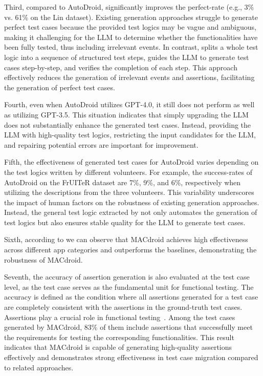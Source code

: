 Third, compared to AutoDroid, \toolNameSmall{} significantly improves the perfect-rate (e.g., 3\% vs. 61\% on the Lin dataset). Existing generation approaches struggle to generate perfect test cases because the provided test logics may be vague and ambiguous, making it challenging for the LLM to determine whether the functionalities have been fully tested, thus including irrelevant events. 
In contrast, \toolNameSmall{} splits a whole test logic into a sequence of structured test steps, guides the LLM to generate test cases step-by-step, and verifies the completion of each step. This approach effectively reduces the generation of irrelevant events and assertions, facilitating the generation of perfect test cases.

Fourth, even when AutoDroid utilizes GPT-4.0, it still does not perform as well as \toolNameSmall{} utilizing GPT-3.5. This situation indicates that simply upgrading the LLM does not substantially enhance the generated test cases. Instead, providing the LLM with high-quality test logics, restricting the input candidates for the LLM, and repairing potential errors are important for improvement.




Fifth, the effectiveness of generated test cases for AutoDroid varies depending on the test logics written by different volunteers. For example, the success-rates of AutoDroid on the FrUITeR dataset are 7\%, 9\%, and 6\%, respectively when utilizing the descriptions from the three volunteers. 
This variability underscores the impact of human factors on the robustness of existing generation approaches. Instead, the general test logic extracted by \toolNameSmall{} not only automates the generation of test logics but also ensures stable quality for the LLM to generate test cases.

Sixth, according to  we can  observe that MACdroid achieves high effectiveness across different app categories and outperforms the baselines, demonstrating the robustness of MACdroid.


Seventh, the accuracy of assertion generation is also evaluated at the test case level, as the test case serves as the fundamental unit for functional testing. The accuracy is defined as the condition where all assertions generated for a test case are completely consistent with the assertions in the ground-truth test cases. Assertions play a crucial role in functional testing~\cite{korel1996assertion, foster2004assertion}. Among the test cases generated by MACdroid, 83\% of them include assertions that successfully meet the requirements for testing the corresponding functionalities.
This result indicates that MACdroid is capable of generating high-quality assertions effectively and demonstrates strong effectiveness in test case migration compared to related approaches.



